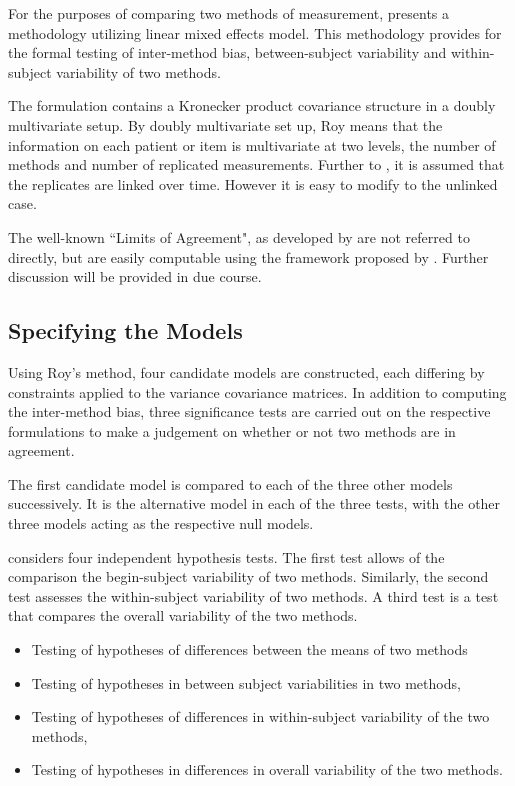 \documentclass[12pt, a4paper]{report}
\theoremstyle{plain}
\theoremstyle{definition}
\theoremstyle{remark}
\begin{document}
	
	
	For the purposes of comparing two methods of measurement, \citet{ARoy2009} presents a methodology utilizing linear mixed effects model. This methodology provides for the formal testing of inter-method bias, between-subject variability and within-subject variability of two methods. 
	
	
	The formulation contains a Kronecker product covariance structure in a doubly multivariate setup. By doubly multivariate set up, Roy means that the information on each patient or item is multivariate at two levels, the number of methods and number of replicated measurements. Further to \citet{lam}, it is assumed that the replicates are linked over time. However it is easy to modify to the unlinked case.

	
	The well-known ``Limits of Agreement", as developed by \citet{BA86} are not referred to directly, but are easily computable using the framework proposed by \citet{ARoy2009}. Further discussion will be provided in due course.	
	
	\subsection{Specifying the Models}
	Using Roy's method, four candidate models are constructed, each differing by constraints applied to the variance covariance matrices. In addition to computing the inter-method bias, three significance tests are carried out on the respective formulations to make a judgement on whether or not two methods are in agreement.
	
	The first candidate model is compared to each of the three other models successively. It is the alternative model in each of the three tests, with the other three models acting as the respective null models.
	
	
	\citet{ARoy2009} considers four independent hypothesis tests. The first test allows of the comparison the begin-subject variability of two methods. Similarly, the second test assesses the within-subject variability of two methods. A third test is a test that compares the overall variability of the two methods.
	\begin{itemize}
		\item Testing of hypotheses of differences between the means of
		two methods\item Testing of hypotheses in between subject
		variabilities in two methods, \item Testing of hypotheses of
		differences in within-subject variability of the two methods,
		\item Testing of hypotheses in differences in overall variability
		of the two methods.
	\end{itemize}
	
\end{document}

